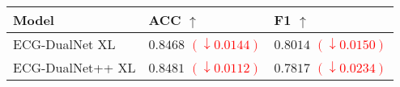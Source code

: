 \begin{tabular}{>{\raggedright\arraybackslash}p{}>{\raggedright\arraybackslash}p{}>{\raggedright\arraybackslash}p{}}
    \hline
	Model & ACC $\uparrow$ & F1 $\uparrow$ \\
	\hline
	ECG-DualNet XL & $0.8468$ \small{\textcolor{red}{$(\downarrow 0.0144)$}} & $0.8014$ \small{\textcolor{red}{$(\downarrow 0.0150)$}} \\
	ECG-DualNet++ XL & $0.8481$ \small{\textcolor{red}{$(\downarrow 0.0112)$}} & $0.7817$ \small{\textcolor{red}{$(\downarrow 0.0234)$}} \\
	\hline
\end{tabular}
